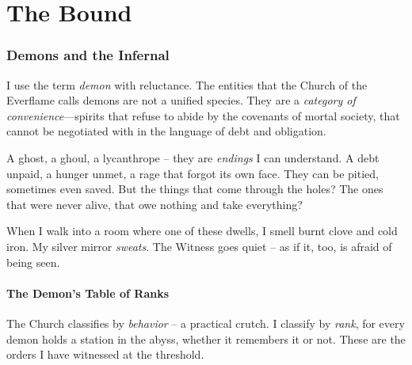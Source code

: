 \part{The Bound}

\section{Demons and the Infernal}

I use the term \emph{demon} with reluctance. The entities that the Church of the Everflame calls demons are not a unified species. They are a \emph{category of convenience}---spirits that refuse to abide by the covenants of mortal society, that cannot be negotiated with in the language of debt and obligation.

A ghost, a ghoul, a lycanthrope -- they are \emph{endings} I can understand. A debt unpaid, a hunger unmet, a rage that forgot its own face. They can be pitied, sometimes even saved. But the things that come through the holes? The ones that were never alive, that owe nothing and take everything?

When I walk into a room where one of these dwells, I smell burnt clove and cold iron. My silver mirror \emph{sweats}. The Witness goes quiet -- as if it, too, is afraid of being seen.

\subsection{The Demon's Table of Ranks}

The Church classifies by \emph{behavior} -- a practical crutch. I classify by \emph{rank}, for every demon holds a station in the abyss, whether it remembers it or not. These are the orders I have witnessed at the threshold.

